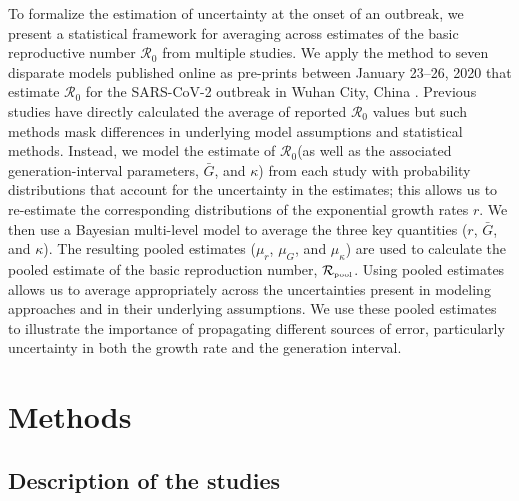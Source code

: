 \documentclass[12pt]{article}
\newcommand{\Ro}{\ensuremath{{\mathcal R}_{0}}\xspace}
\newcommand{\Rpool}{\ensuremath{{\mathcal R}_{\textrm{\tiny{pool}}}}\xspace}
\begin{document}
To formalize the estimation of uncertainty at the onset of an outbreak, we present a statistical framework for averaging across estimates of the basic reproductive number \Ro from multiple studies. 
We apply the method to seven disparate models published online as pre-prints between January 23--26, 2020 that estimate \Ro for the SARS-CoV-2 outbreak in Wuhan City, China \citep{bedfordncov, imaincov, liuncov, majumderncov, readncov, riouncov, zhaoncov}.
Previous studies have directly calculated the average of reported \Ro values \citep{majumder2020early, liu2020reproductive} but such methods mask differences in underlying model assumptions and statistical methods.
Instead, we model the estimate of \Ro (as well as the associated generation-interval parameters, $\bar G$, and $\kappa$) from each study with probability distributions that account for the uncertainty in the estimates;
this allows us to re-estimate the corresponding distributions of the exponential growth rates $r$.
We then use a Bayesian multi-level model to average the three key quantities ($r$, $\bar G$, and $\kappa$).
The resulting pooled estimates ($\mu_r$, $\mu_G$, and $\mu_\kappa$) are used to calculate the pooled estimate of the basic reproduction number, \Rpool.
Using pooled estimates allows us to average appropriately across the uncertainties present in modeling approaches and in their underlying assumptions.
We use these pooled estimates to illustrate the importance of propagating different sources of error, particularly uncertainty in both the growth rate and the generation interval.

\section{Methods}

\subsection{Description of the studies}
\end{document}
